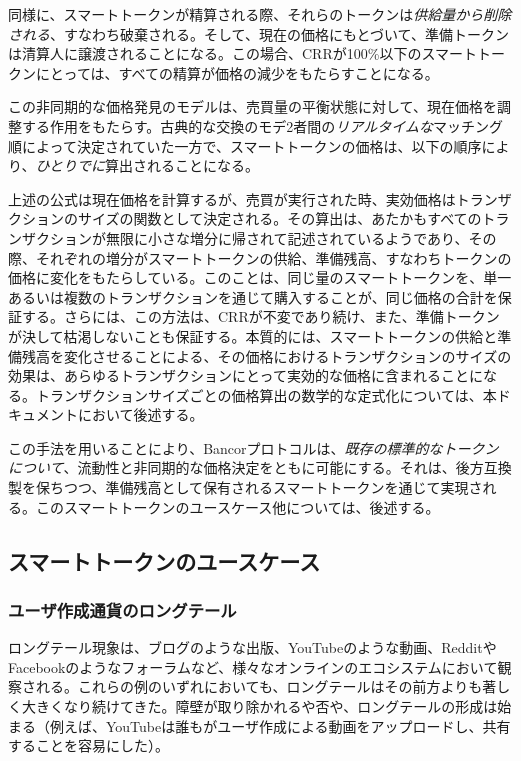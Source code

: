 \documentclass{jsarticle}
\begin{document}
  同様に、スマートトークンが精算される際、それらのトークンは\emph{供給量から削除される}、すなわち破棄される。そして、現在の価格にもとづいて、準備トークンは清算人に譲渡されることになる。この場合、CRRが100\%以下のスマートトークンにとっては、すべての精算が価格の減少をもたらすことになる。

  この非同期的な価格発見のモデルは、売買量の平衡状態に対して、現在価格を調整する作用をもたらす。古典的な交換のモデ2者間の\emph{リアルタイムな}マッチング順によって決定されていた一方で、スマートトークンの価格は、以下の順序により、\emph{ひとりでに}算出されることになる。

  上述の公式は現在価格を計算するが、売買が実行された時、実効価格はトランザクションのサイズの関数として決定される。その算出は、あたかもすべてのトランザクションが無限に小さな増分に帰されて記述されているようであり、その際、それぞれの増分がスマートトークンの供給、準備残高、すなわちトークンの価格に変化をもたらしている。このことは、同じ量のスマートトークンを、単一あるいは複数のトランザクションを通じて購入することが、同じ価格の合計を保証する。さらには、この方法は、CRRが不変であり続け、また、準備トークンが決して枯渇しないことも保証する。本質的には、スマートトークンの供給と準備残高を変化させることによる、その価格におけるトランザクションのサイズの効果は、あらゆるトランザクションにとって実効的な価格に含まれることになる。トランザクションサイズごとの価格算出の数学的な定式化については、本ドキュメントにおいて後述する。

  この手法を用いることにより、Bancorプロトコルは、\emph{既存の標準的なトークンについて}、流動性と非同期的な価格決定をともに可能にする。それは、後方互換製を保ちつつ、準備残高として保有されるスマートトークンを通じて実現される。このスマートトークンのユースケース他については、後述する。

  \subsection{スマートトークンのユースケース}

    \subsubsection{ユーザ作成通貨のロングテール}

    ロングテール現象は、ブログのような出版、YouTubeのような動画、RedditやFacebookのようなフォーラムなど、様々なオンラインのエコシステムにおいて観察される。これらの例のいずれにおいても、ロングテールはその前方よりも著しく大きくなり続けてきた。障壁が取り除かれるや否や、ロングテールの形成は始まる（例えば、YouTubeは誰もがユーザ作成による動画をアップロードし、共有することを容易にした）。
\end{document}

